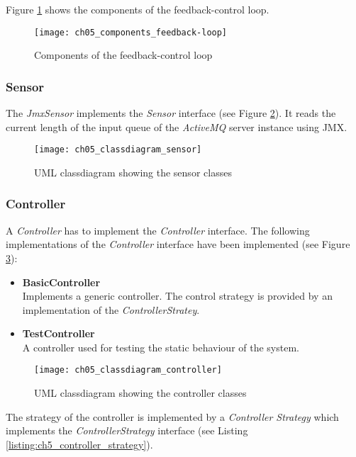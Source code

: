 Figure \ref{fig:ch05_components_feedback_loop} shows the components of the feedback-control loop.

\begin{figure}[htbp]
	\centering
	\texttt{[image: ch05\_components\_feedback-loop]}
	\caption{Components of the feedback-control loop}
	\label{fig:ch05_components_feedback_loop}
\end{figure}

\subsubsection{Sensor}

The \emph{JmxSensor} implements the \emph{Sensor} interface (see Figure \ref{fig:ch05_classdiagram_sensor}). It reads the current length of the input queue of the \emph{ActiveMQ} server instance using \ac{JMX}.

\begin{figure}[htbp]
	\centering
	\texttt{[image: ch05\_classdiagram\_sensor]}
	\caption{\ac{UML} classdiagram showing the sensor classes}
	\label{fig:ch05_classdiagram_sensor}
\end{figure}

\subsubsection{Controller}
\label{sec:ch05_controller}
A \emph{Controller} has to implement the \emph{Controller} interface. The following implementations of the \emph{Controller} interface have been implemented (see Figure \ref{fig:ch05_classdiagram_controller}):
\begin{itemize}
	\item \textbf{BasicController}\\
	Implements a generic controller. The control strategy is provided by an implementation of the \emph{ControllerStratey}.
	\item \textbf{TestController}\\
	A controller used for testing the static behaviour of the system.
\end{itemize}

\begin{figure}[htbp]
	\centering
	\texttt{[image: ch05\_classdiagram\_controller]}
	\caption{\ac{UML} classdiagram showing the controller classes}
	\label{fig:ch05_classdiagram_controller}
\end{figure}

The strategy of the controller is implemented by a \emph{Controller Strategy} which implements the \emph{ControllerStrategy} interface (see Listing \ref{listing:ch5_controller_strategy}).

